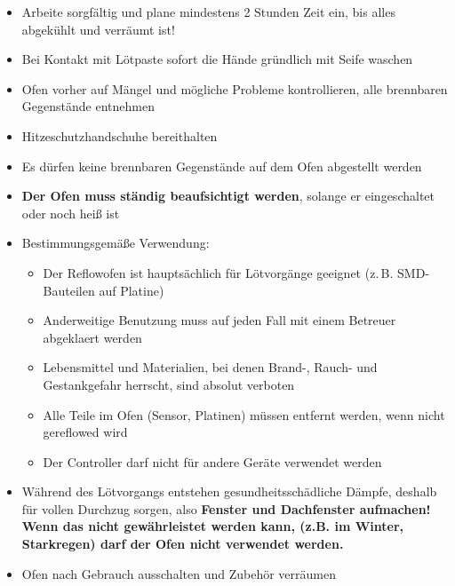 \documentclass[fontsize=11pt]{scrartcl}
\begin{document}
\begin{itemize}
	\item Arbeite sorgfältig und plane mindestens 2 Stunden Zeit ein, bis alles abgekühlt und verräumt ist!
	\item Bei Kontakt mit Lötpaste sofort die Hände gründlich mit Seife waschen
	\item Ofen vorher auf Mängel und mögliche Probleme kontrollieren, alle brennbaren Gegenstände entnehmen
	\item Hitzeschutzhandschuhe bereithalten
	\item Es dürfen keine brennbaren Gegenstände auf dem Ofen abgestellt werden
	\item \textbf{Der Ofen muss ständig beaufsichtigt werden}, solange er eingeschaltet oder noch heiß ist
	\item Bestimmungsgemäße Verwendung:

\begin{itemize}
	\setlength{\itemsep}{-3pt}
	\item Der Reflowofen ist hauptsächlich für Lötvorgänge geeignet (z.\,B. SMD-Bauteilen auf Platine)
	\item Anderweitige Benutzung muss auf jeden Fall mit einem Betreuer abgeklaert werden
	\item Lebensmittel und Materialien, bei denen Brand-, Rauch- und Gestankgefahr herrscht, sind absolut verboten
	\item Alle Teile im Ofen (Sensor, Platinen) müssen entfernt werden, wenn nicht gereflowed wird
	\item Der Controller darf nicht für andere Geräte verwendet werden
\end{itemize}
	\item Während des Lötvorgangs entstehen gesundheitsschädliche Dämpfe, deshalb für vollen Durchzug sorgen, also \textbf{Fenster und Dachfenster aufmachen! Wenn das nicht gewährleistet werden kann, (z.B. im Winter, Starkregen) darf der Ofen nicht verwendet werden.}
	\item Ofen nach Gebrauch ausschalten und Zubehör verräumen
\end{itemize}
\end{document}
